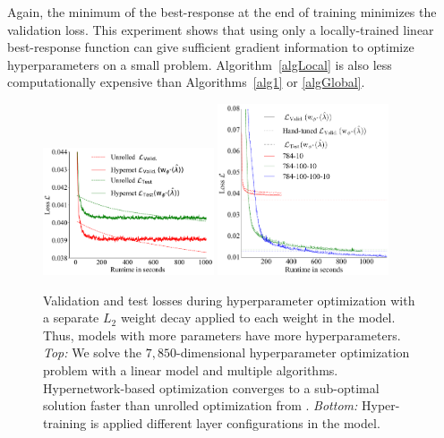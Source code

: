 \documentclass{article} %
\newcommand{\param}{\mathrm{w}} %
\newcommand{\curRename}[1]{\smash{\hat{#1}}} %
\begin{document}
Again, the minimum of the best-response at the end of training minimizes the validation loss.
This experiment shows that using only a locally-trained linear best-response function can give sufficient gradient information to optimize hyperparameters on a small problem.
Algorithm~\ref{algLocal} is also less computationally expensive than Algorithms~\ref{alg1} or \ref{algGlobal}.
%
\begin{figure}
\vspace{-0.05\textheight}
\includegraphics[width=0.45\textwidth]{hypernets_local_large.pdf}
\includegraphics[width=0.45\textwidth]{compare_number_layers.png}
\caption{
Validation and test losses during hyperparameter optimization with a separate $L_{2}$ weight decay applied to each weight in the model.
Thus, models with more parameters have more hyperparameters.
\emph{Top:} We solve the $7,850$-dimensional hyperparameter optimization problem with a linear model and multiple algorithms.
Hypernetwork-based optimization converges to a sub-optimal solution faster than unrolled optimization from \citet{maclaurin2015gradient}.
\emph{Bottom:} Hyper-training is applied different layer configurations in the model.
\label{fig:exp3}
}
\end{figure}
\end{document}
